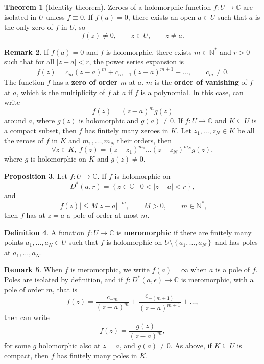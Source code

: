 \documentclass{article}
\newcommand{\N}{\mathbb{N}}
\newcommand{\C}{\mathbb{C}}
\newcommand{\rb}[1]{\left( #1 \right)}
\newcommand{\cb}[1]{\left\{ #1 \right\}}
\newcommand{\abs}[1]{\left\lvert #1 \right\rvert}
\theoremstyle{definition}\newtheorem{definition}{Definition}[section]
\theoremstyle{definition}\newtheorem{notation}[definition]{Notation}
\theoremstyle{definition}\newtheorem{remark}[definition]{Remark}
\theoremstyle{definition}\newtheorem{example1}[definition]{Example}
\theoremstyle{definition}\newtheorem{fact}{Fact}
\theoremstyle{definition}\newtheorem{exercise}{Exercise}
\theoremstyle{definition}\newtheorem*{example2}{Example}
\newtheorem{proposition}[definition]{Proposition}
\newtheorem{theorem}[definition]{Theorem}
\begin{document}

\begin{theorem}[Identity theorem]
Zeroes of a holomorphic function $ f : U \to \C $ are isolated in $ U $ unless $ f \equiv 0 $. If $ f\rb{a} = 0 $, there exists an open $ a \in U $ such that $ a $ is the only zero of $ f $ in $ U $, so
$$ f\rb{z} \ne 0, \qquad z \in U, \qquad z \ne a. $$
\end{theorem}

\begin{remark}
If $ f\rb{a} = 0 $ and $ f $ is holomorphic, there exists $ m \in \N^* $ and $ r > 0 $ such that for all $ \abs{z - a} < r $, the power series expansion is
$$ f\rb{z} = c_m\rb{z - a}^m + c_{m + 1}\rb{z - a}^{m + 1} + \dots, \qquad c_m \ne 0. $$
The function $ f $ has a \textbf{zero of order $ m $} at $ a $. $ m $ is the \textbf{order of vanishing} of $ f $ at $ a $, which is the multiplicity of $ f $ at $ a $ if $ f $ is a polynomial. In this case, can write
$$ f\rb{z} = \rb{z - a}^mg\rb{z} $$
around $ a $, where $ g\rb{z} $ is holomorphic and $ g\rb{a} \ne 0 $. If $ f : U \to \C $ and $ K \subseteq U $ is a compact subset, then $ f $ has finitely many zeroes in $ K $. Let $ z_1, \dots, z_N \in K $ be all the zeroes of $ f $ in $ K $ and $ m_1, \dots, m_N $ their orders, then
$$ \forall z \in K, \ f\rb{z} = \rb{z - z_1}^{m_1} \dots \rb{z - z_N}^{m_N}g\rb{z}, $$
where $ g $ is holomorphic on $ K $ and $ g\rb{z} \ne 0 $.
\end{remark}

\begin{proposition}
Let $ f : U \to \C $. If $ f $ is holomorphic on
$$ D^*\rb{a, r} = \cb{z \in \C \mid 0 < \abs{z - a} < r}, $$
and
$$ \abs{f\rb{z}} \le M\abs{z - a}^{-m}, \qquad M > 0, \qquad m \in \N^*, $$
then $ f $ has at $ z = a $ a pole of order at most $ m $.
\end{proposition}

\begin{definition}
A function $ f : U \to \C $ is \textbf{meromorphic} if there are finitely many points $ a_1, \dots, a_N \in U $ such that $ f $ is holomorphic on $ U \setminus \cb{a_1, \dots, a_N} $ and has poles at $ a_1, \dots, a_N $.
\end{definition}

\begin{remark}
When $ f $ is meromorphic, we write $ f\rb{a} = \infty $ when $ a $ is a pole of $ f $. Poles are isolated by definition, and if $ f : D^*\rb{a, \epsilon} \to \C $ is meromorphic, with a pole of order $ m $, that is
$$ f\rb{z} = \dfrac{c_{-m}}{\rb{z - a}^m} + \dfrac{c_{-\rb{m + 1}}}{\rb{z - a}^{m + 1}} + \dots, $$
then can write
$$ f\rb{z} = \dfrac{g\rb{z}}{\rb{z - a}^m}, $$
for some $ g $ holomorphic also at $ z = a $, and $ g\rb{a} \ne 0 $. As above, if $ K \subseteq U $ is compact, then $ f $ has finitely many poles in $ K $.
\end{remark}
\end{document}
